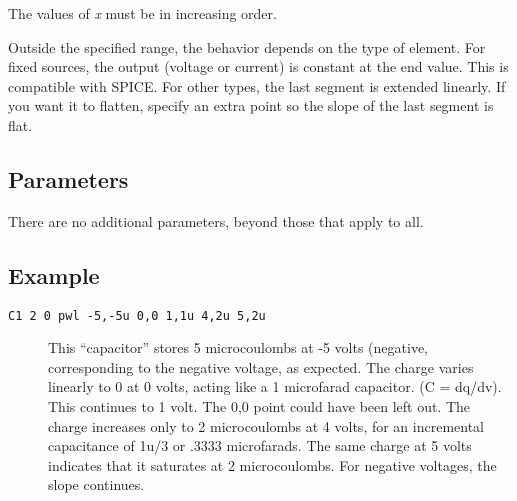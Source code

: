 The values of {\it x} must be in increasing order.

Outside the specified range, the behavior depends on the type of
element.  For fixed sources, the output (voltage or current) is
constant at the end value.  This is compatible with SPICE.  For other
types, the last segment is extended linearly.  If you want it to
flatten, specify an extra point so the slope of the last segment is
flat.
\subsection{Parameters}

There are no additional parameters, beyond those that apply to all.
\subsection{Example} 

\begin{description}

\item[{\tt C1 2 0 pwl -5,-5u 0,0 1,1u 4,2u 5,2u}] This ``capacitor''
stores 5 microcoulombs at -5 volts (negative, corresponding to the
negative voltage, as expected.  The charge varies linearly to 0 at 0
volts, acting like a 1 microfarad capacitor.  (C = dq/dv).  This
continues to 1 volt.  The 0,0 point could have been left out.  The
charge increases only to 2 microcoulombs at 4 volts, for an
incremental capacitance of 1u/3 or .3333 microfarads.  The same charge 
at 5 volts indicates that it saturates at 2 microcoulombs.  For
negative voltages, the slope continues.

\end{description}
